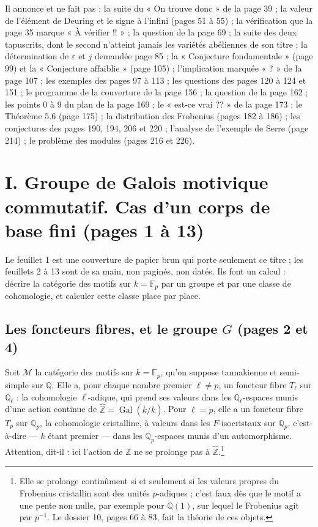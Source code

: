 \documentclass[11pt,a4paper]{article}
\begin{document}
Il annonce et ne fait pas : la suite du « On trouve donc » de la page 39 ;
la valeur de l'élément de Deuring et le signe à l'infini (pages 51 à 55) ;
la vérification que la page 35 marque « À vérifier !! » ; la question de la
page 69 ; la suite des deux tapuscrits, dont le second n'atteint jamais les
variétés abéliennes de son titre ; la détermination de $\varepsilon$ et $j$
demandée page 85 ; la « Conjecture fondamentale » (page 99) et la
« Conjecture affaiblie » (page 105) ; l'implication marquée « ? » de la page
107 ; les exemples des pages 97 à 113 ; les questions des pages 120 à 124 et
151 ; le programme de la couverture de la page 156 ; la question de la page
162 ; les points 0 à 9 du plan de la page 169 ; le « est-ce vrai ?? » de la
page 173 ; le Théorème 5.6 (page 175) ; la distribution des Frobenius (pages
182 à 186) ; les conjectures des pages 190, 194, 206 et 220 ; l'analyse de
l'exemple de Serre (page 214) ; le problème des modules (pages 216 et 226).

\section*{I. Groupe de Galois motivique commutatif. Cas d'un corps de base fini (pages 1 à 13)}

Le feuillet 1 est une couverture de papier brun qui porte seulement ce titre ;
les feuillets 2 à 13 sont de sa main, non paginés, non datés. Ils font un
calcul : décrire la catégorie des motifs sur $k = \mathbb{F}_{p}$ par un groupe
et par une classe de cohomologie, et calculer cette classe place par place.

\subsection*{Les foncteurs fibres, et le groupe $G$ (pages 2 et 4)}

Soit $\mathcal{M}$ la catégorie des motifs sur $k = \mathbb{F}_{p}$, qu'on
suppose tannakienne et semi-simple sur $\mathbb{Q}$. Elle a, pour chaque nombre
premier $\ell \neq p$, un foncteur fibre $T_{\ell}$ sur $\mathbb{Q}_{\ell}$ : la
cohomologie $\ell$-adique, qui prend ses valeurs dans les
$\mathbb{Q}_{\ell}$-espaces munis d'une action continue de $\widehat{\mathbb{Z}}
= \operatorname{Gal}(\bar{k}/k)$. Pour $\ell = p$, elle a un foncteur fibre
$T_{p}$ sur $\mathbb{Q}_{p}$, la cohomologie cristalline, à valeurs dans les
$F$-isocristaux sur $\mathbb{Q}_{p}$, c'est-à-dire --- $k$ étant premier --- dans
les $\mathbb{Q}_{p}$-espaces munis d'un automorphisme. Attention, dit-il : ici
l'action de $\mathbb{Z}$ ne se prolonge pas à $\widehat{\mathbb{Z}}$.\footnote{Elle
se prolonge continûment si et seulement si les valeurs propres du Frobenius
cristallin sont des unités $p$-adiques ; c'est faux dès que le motif a une
pente non nulle, par exemple pour $\mathbb{Q}(1)$, sur lequel le Frobenius agit
par $p^{-1}$. Le dossier 10, pages 66 à 83, fait la théorie de ces objets.}
\end{document}

